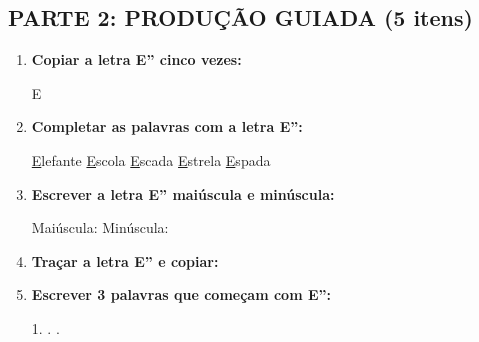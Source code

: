 \begin{exercicio}
\subsection*{PARTE 2: PRODUÇÃO GUIADA (5 itens)}

\begin{enumerate}[resume]
  \item \textbf{Copiar a letra E'' cinco vezes:}
  \begin{center}
  E \quad \underline{\hspace{1.5cm}} \quad \underline{\hspace{1.5cm}} \quad \underline{\hspace{1.5cm}} \quad \underline{\hspace{1.5cm}} \quad \underline{\hspace{1.5cm}}
  \end{center}

  \item \textbf{Completar as palavras com a letra E'':}
  \begin{center}
  \underline{E}lefante \quad \underline{E}scola \quad \underline{E}scada \quad \underline{E}strela \quad \underline{E}spada
  \end{center}

  \item \textbf{Escrever a letra E'' maiúscula e minúscula:}
  \begin{center}
  Maiúscula: \underline{\hspace{2cm}} \quad Minúscula: \underline{\hspace{2cm}}
  \end{center}

  \item \textbf{Traçar a letra E'' e copiar:}
  \begin{center}
  \end{center}

  \item \textbf{Escrever 3 palavras que começam com E'':}
  \begin{center}
  1. \underline{\hspace{3cm}} . \underline{\hspace{3cm}} . \underline{\hspace{3cm}}
  \end{center}
\end{enumerate}


\end{exercicio}
